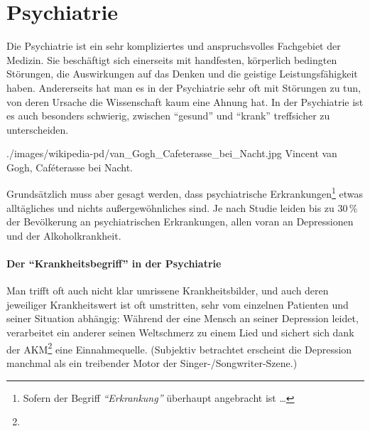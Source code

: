 {\TakeNotesLarge}



\section{Psychiatrie}
\nocite{WunnPsych1,OHCSP7}

{
Die Psychiatrie ist ein sehr kompliziertes und
anspruchsvolles Fachgebiet der Medizin. Sie beschäftigt
sich einerseits mit handfesten, körperlich bedingten
Störungen, die Auswirkungen auf das Denken und die geistige
Leistungsfähigkeit haben. Andererseits hat man es in der
Psychiatrie sehr oft mit Störungen zu tun, von deren
Ursache die Wissenschaft kaum eine Ahnung hat. In der
Psychiatrie ist es auch besonders schwierig, zwischen
"`gesund"' und "`krank"' treffsicher zu unterscheiden. 
}{

}
{./images/wikipedia-pd/van_Gogh_Cafeterasse_bei_Nacht.jpg}
{Vincent van Gogh, Caféterasse bei Nacht.}{}


Grundsätzlich muss aber gesagt werden, dass psychiatrische
Erkrankungen\footnote{Sofern der Begriff
\emph{"`Erkrankung"'} überhaupt angebracht ist \ldots}
etwas alltägliches und nichts außergewöhnliches sind. Je nach Studie leiden bis zu 30\,\% der Bevölkerung an psychiatrischen Erkrankungen, allen voran an
Depressionen und der Alkoholkrankheit. 



\paragraph{Der "`Krankheitsbegriff"' in der Psychiatrie} Man
trifft oft auch nicht klar umrissene Krankheitsbilder, und auch deren jeweiliger Krankheitswert ist oft umstritten,
sehr vom einzelnen Patienten und seiner Situation abhängig: Während der eine
Mensch an seiner Depression leidet, verarbeitet ein anderer seinen Weltschmerz
zu einem Lied und sichert sich dank der AKM\footnote{} eine Einnahmequelle. (Subjektiv
betrachtet erscheint die Depression manchmal als ein treibender Motor der
Singer-/Songwriter-Szene.) 


